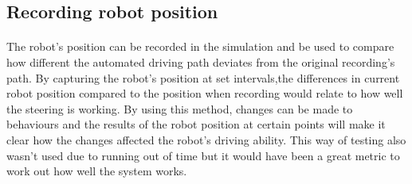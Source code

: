 \subsection{Recording robot position}
\paragraph{}
The robot's position can be recorded in the simulation and be used to compare how different the automated driving path deviates from the original recording's path. By capturing the robot's position at set intervals,the differences in current robot position compared to the position when recording would relate to how well the steering is working. By using this method, changes can be made to behaviours and the results of the robot position at certain points will make it clear how the changes affected the robot's driving ability. This way of testing also wasn't used due to running out of time but it would have been a great metric to work out how well the system works.


